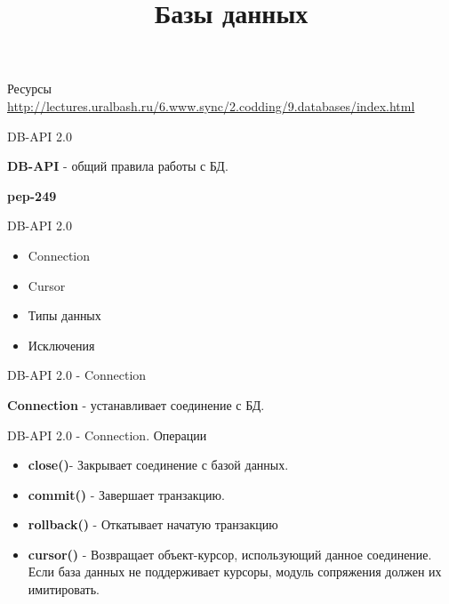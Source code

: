 

\title{Базы данных}



\frame{\titlepage}

\begin{frame}{Ресурсы}
  \url{http://lectures.uralbash.ru/6.www.sync/2.codding/9.databases/index.html}
\end{frame}

\begin{frame}{DB-API 2.0}

  \textbf{DB-API} - общий правила работы с БД.

  \textbf{pep-249}\newline

\end{frame}

\begin{frame}{DB-API 2.0}

  \begin{itemize}
    \item Connection
    \item Cursor
    \item Типы данных
    \item Исключения
  \end{itemize}

\end{frame}

\begin{frame}{DB-API 2.0 - Connection}

  \textbf{Connection} - устанавливает соединение с БД.

\end{frame}

\begin{frame}{DB-API 2.0 - Connection. Операции}

  \begin{itemize}

    \item \textbf{close()}- Закрывает соединение с базой данных.
    \item \textbf{commit()} - Завершает транзакцию.
    \item \textbf{rollback()} - Откатывает начатую транзакцию
    \item \textbf{cursor()} - Возвращает объект-курсор, использующий данное
      соединение.  Если база данных не поддерживает курсоры, модуль сопряжения
      должен их имитировать.

  \end{itemize}

\end{frame}

